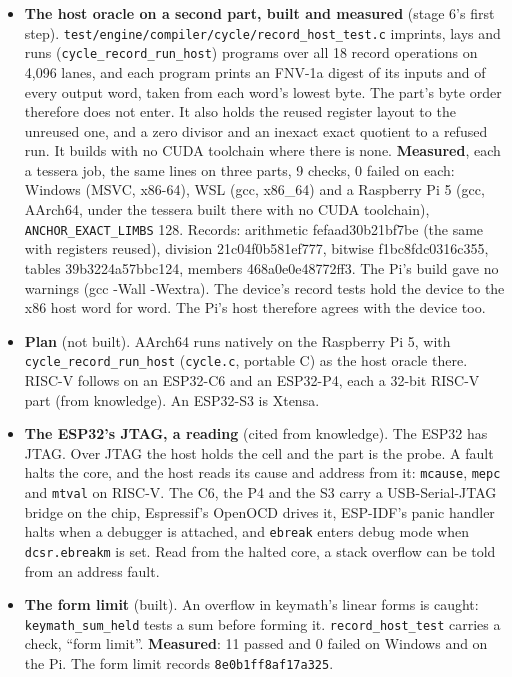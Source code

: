 \begin{enumerate}
\begin{itemize}
\begin{enumerate}
\begin{itemize}
\item \textbf{The host oracle on a second part, built and measured} (stage 6's first step). \texttt{test/\allowbreak{}engine/\allowbreak{}compiler/\allowbreak{}cycle/\allowbreak{}record\_\allowbreak{}host\_\allowbreak{}test.\allowbreak{}c} imprints, lays and runs (\texttt{cycle\_\allowbreak{}record\_\allowbreak{}run\_\allowbreak{}host}) programs over all 18 record operations on 4,096 lanes, and each program prints an FNV-1a digest of its inputs and of every output word, taken from each word's lowest byte. The part's byte order therefore does not enter. It also holds the reused register layout to the unreused one, and a zero divisor and an inexact exact quotient to a refused run. It builds with no CUDA toolchain where there is none. \textbf{Measured}, each a tessera job, the same lines on three parts, 9 checks, 0 failed on each: Windows (MSVC, x86-64), WSL (gcc, x86\_\allowbreak{}64) and a Raspberry Pi 5 (gcc, AArch64, under the tessera built there with no CUDA toolchain), \texttt{ANCHOR\_\allowbreak{}EXACT\_\allowbreak{}LIMBS} 128. Records: arithmetic fefaad30b21bf7be (the same with registers reused), division 21c04f0b581ef777, bitwise f1bc8fdc0316c355, tables 39b3224a57bbc124, members 468a0e0e48772ff3. The Pi's build gave no warnings (gcc -Wall -Wextra). The device's record tests hold the device to the x86 host word for word. The Pi's host therefore agrees with the device too.
\item \textbf{Plan} (not built). AArch64 runs natively on the Raspberry Pi 5, with \texttt{cycle\_\allowbreak{}record\_\allowbreak{}run\_\allowbreak{}host} (\texttt{cycle.\allowbreak{}c}, portable C) as the host oracle there. RISC-V follows on an ESP32-C6 and an ESP32-P4, each a 32-bit RISC-V part (from knowledge). An ESP32-S3 is Xtensa.
\item \textbf{The ESP32's JTAG, a reading} (cited from knowledge). The ESP32 has JTAG. Over JTAG the host holds the cell and the part is the probe. A fault halts the core, and the host reads its cause and address from it: \texttt{mcause}, \texttt{mepc} and \texttt{mtval} on RISC-V. The C6, the P4 and the S3 carry a USB-Serial-JTAG bridge on the chip, Espressif's OpenOCD drives it, ESP-IDF's panic handler halts when a debugger is attached, and \texttt{ebreak} enters debug mode when \texttt{dcsr.\allowbreak{}ebreakm} is set. Read from the halted core, a stack overflow can be told from an address fault.
\item \textbf{The form limit} (built). An overflow in keymath's linear forms is caught: \texttt{keymath\_\allowbreak{}sum\_\allowbreak{}held} tests a sum before forming it. \texttt{record\_\allowbreak{}host\_\allowbreak{}test} carries a check, “form limit”. \textbf{Measured}: 11 passed and 0 failed on Windows and on the Pi. The form limit records \texttt{8e0b1ff8af17a325}.

\end{itemize}
\end{enumerate}
\end{itemize}
\end{enumerate}
